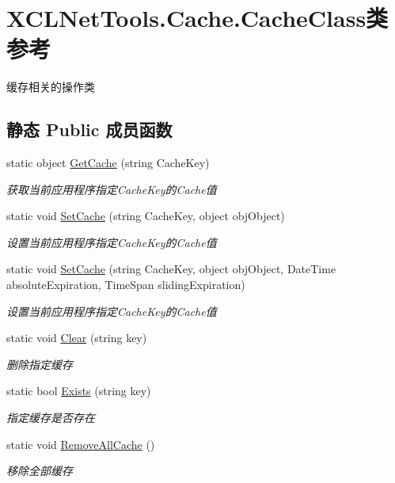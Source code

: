 \hypertarget{class_x_c_l_net_tools_1_1_cache_1_1_cache_class}{\section{X\-C\-L\-Net\-Tools.\-Cache.\-Cache\-Class类 参考}
\label{class_x_c_l_net_tools_1_1_cache_1_1_cache_class}
}


缓存相关的操作类  


\subsection*{静态 Public 成员函数}
\begin{DoxyCompactItemize}
\item 
static object \hyperlink{class_x_c_l_net_tools_1_1_cache_1_1_cache_class_aa4eb429181d14c79040ea957bb4b8308}{Get\-Cache} (string Cache\-Key)
\begin{DoxyCompactList}\small\item\em 获取当前应用程序指定\-Cache\-Key的\-Cache值 \end{DoxyCompactList}\item 
static void \hyperlink{class_x_c_l_net_tools_1_1_cache_1_1_cache_class_a1f815a266c55067bab54e36c276ea82b}{Set\-Cache} (string Cache\-Key, object obj\-Object)
\begin{DoxyCompactList}\small\item\em 设置当前应用程序指定\-Cache\-Key的\-Cache值 \end{DoxyCompactList}\item 
static void \hyperlink{class_x_c_l_net_tools_1_1_cache_1_1_cache_class_a12454bcf0c4d79e76937bbd927df631e}{Set\-Cache} (string Cache\-Key, object obj\-Object, Date\-Time absolute\-Expiration, Time\-Span sliding\-Expiration)
\begin{DoxyCompactList}\small\item\em 设置当前应用程序指定\-Cache\-Key的\-Cache值 \end{DoxyCompactList}\item 
static void \hyperlink{class_x_c_l_net_tools_1_1_cache_1_1_cache_class_afeab3c01d1a7b41007235b97f3fbaa35}{Clear} (string key)
\begin{DoxyCompactList}\small\item\em 删除指定缓存 \end{DoxyCompactList}\item 
static bool \hyperlink{class_x_c_l_net_tools_1_1_cache_1_1_cache_class_aa7640102a9327d10ff130c69b724e27b}{Exists} (string key)
\begin{DoxyCompactList}\small\item\em 指定缓存是否存在 \end{DoxyCompactList}\item 
static void \hyperlink{class_x_c_l_net_tools_1_1_cache_1_1_cache_class_a36ade93bd935dbad5740285d48e2c5e6}{Remove\-All\-Cache} ()
\begin{DoxyCompactList}\small\item\em 移除全部缓存 \end{DoxyCompactList}\end{DoxyCompactItemize}


